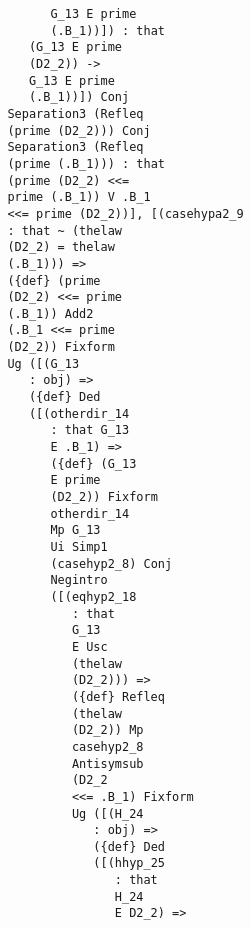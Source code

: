 \documentclass[12pt]{article}
\begin{document}
\begin{verbatim}
                                  G_13 E prime 
                                  (.B_1))]) : that 
                               (G_13 E prime 
                               (D2_2)) -> 
                               G_13 E prime 
                               (.B_1))]) Conj 
                            Separation3 (Refleq 
                            (prime (D2_2))) Conj 
                            Separation3 (Refleq 
                            (prime (.B_1))) : that 
                            (prime (D2_2) <<= 
                            prime (.B_1)) V .B_1 
                            <<= prime (D2_2))], [(casehypa2_9 
                            : that ~ (thelaw 
                            (D2_2) = thelaw 
                            (.B_1))) => 
                            ({def} (prime 
                            (D2_2) <<= prime 
                            (.B_1)) Add2 
                            (.B_1 <<= prime 
                            (D2_2)) Fixform 
                            Ug ([(G_13 
                               : obj) => 
                               ({def} Ded 
                               ([(otherdir_14 
                                  : that G_13 
                                  E .B_1) => 
                                  ({def} (G_13 
                                  E prime 
                                  (D2_2)) Fixform 
                                  otherdir_14 
                                  Mp G_13 
                                  Ui Simp1 
                                  (casehyp2_8) Conj 
                                  Negintro 
                                  ([(eqhyp2_18 
                                     : that 
                                     G_13 
                                     E Usc 
                                     (thelaw 
                                     (D2_2))) => 
                                     ({def} Refleq 
                                     (thelaw 
                                     (D2_2)) Mp 
                                     casehyp2_8 
                                     Antisymsub 
                                     (D2_2 
                                     <<= .B_1) Fixform 
                                     Ug ([(H_24 
                                        : obj) => 
                                        ({def} Ded 
                                        ([(hhyp_25 
                                           : that 
                                           H_24 
                                           E D2_2) => 

\end{verbatim}
\end{document}
